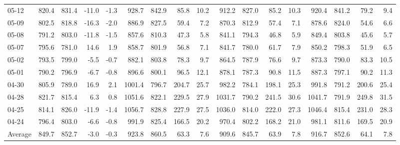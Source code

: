 \begin{threeparttable}
{\begin{tabular}{lrrrrrrrrrrrrrrrr}
  05-12 & 820.4 & 831.4 &      -11.0 &           -1.3 &  928.7 & 842.9 &       85.8 &           10.2 &  912.2 & 827.0 &       85.2 &           10.3 &  920.4 &  841.2 &        79.2 &              9.4 \\
  05-09 & 802.5 & 818.8 &      -16.3 &           -2.0 &  886.9 & 827.5 &       59.4 &            7.2 &  870.3 & 812.9 &       57.4 &            7.1 &  878.6 &  824.0 &        54.6 &              6.6 \\
  05-08 & 791.2 & 803.0 &      -11.8 &           -1.5 &  857.6 & 810.3 &       47.3 &            5.8 &  841.1 & 794.3 &       46.8 &            5.9 &  849.4 &  803.8 &        45.6 &              5.7 \\
  05-07 & 795.6 & 781.0 &       14.6 &            1.9 &  858.7 & 801.9 &       56.8 &            7.1 &  841.7 & 780.0 &       61.7 &            7.9 &  850.2 &  798.3 &        51.9 &              6.5 \\
  05-02 & 793.5 & 799.0 &       -5.5 &           -0.7 &  882.1 & 803.8 &       78.3 &            9.7 &  864.5 & 787.9 &       76.6 &            9.7 &  873.3 &  790.0 &        83.3 &             10.5 \\
  05-01 & 790.2 & 796.9 &       -6.7 &           -0.8 &  896.6 & 800.1 &       96.5 &           12.1 &  878.1 & 787.3 &       90.8 &           11.5 &  887.3 &  797.1 &        90.2 &             11.3 \\
  04-30 & 805.9 & 789.0 &       16.9 &            2.1 & 1001.4 & 796.7 &      204.7 &           25.7 &  982.2 & 784.1 &      198.1 &           25.3 &  991.8 &  791.2 &       200.6 &             25.4 \\
  04-28 & 821.7 & 815.4 &        6.3 &            0.8 & 1051.6 & 822.1 &      229.5 &           27.9 & 1031.7 & 790.2 &      241.5 &           30.6 & 1041.7 &  791.9 &       249.8 &             31.5 \\
  04-25 & 814.1 & 826.0 &      -11.9 &           -1.4 & 1056.7 & 828.8 &      227.9 &           27.5 & 1036.0 & 814.0 &      222.0 &           27.3 & 1046.4 &  815.4 &       231.0 &             28.3 \\
  04-24 & 796.4 & 803.0 &       -6.6 &           -0.8 &  991.9 & 825.4 &      166.5 &           20.2 &  970.4 & 802.2 &      168.2 &           21.0 &  981.1 &  811.6 &       169.5 &             20.9 \\
Average & 849.7 & 852.7 &       -3.0 &           -0.3 &  923.8 & 860.5 &       63.3 &            7.6 &  909.6 & 845.7 &       63.9 &            7.8 &  916.7 &  852.6 &        64.1 &              7.8 \\

\end{tabular}}
\end{threeparttable}
